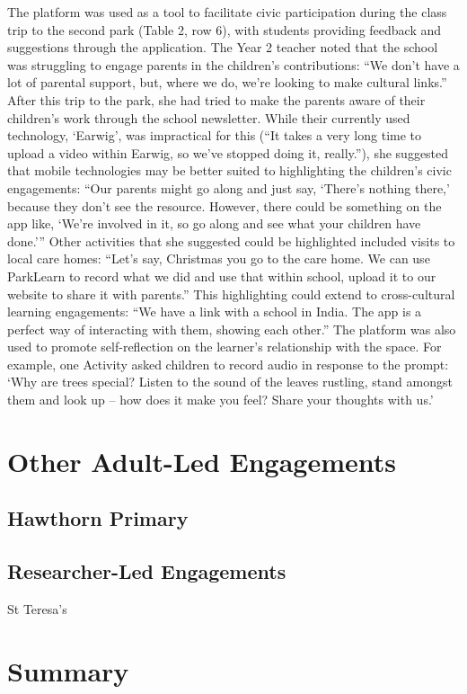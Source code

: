 The platform was used as a tool to facilitate civic participation during the class trip to the second park (Table 2, row 6), with students providing feedback and suggestions through the application. The Year 2 teacher noted that the school was struggling to engage parents in the children’s contributions: “We don’t have a lot of parental support, but, where we do, we’re looking to make cultural links.” After this trip to the park, she had tried to make the parents aware of their children’s work through the school newsletter. While their currently used technology, ‘Earwig’, was impractical for this (“It takes a very long time to upload a video within Earwig, so we’ve stopped doing it, really.”), she suggested that mobile technologies may be better suited to highlighting the children’s civic engagements: “Our parents might go along and just say, ‘There’s nothing there,’ because they don’t see the resource. However, there could be something on the app like, ‘We’re involved in it, so go along and see what your children have done.’” Other activities that she suggested could be highlighted included visits to local care homes: “Let’s say, Christmas you go to the care home. We can use ParkLearn to record what we did and use that within school, upload it to our website to share it with parents.” This highlighting could extend to cross-cultural learning engagements: “We have a link with a school in India. The app is a perfect way of interacting with them, showing each other.” The platform was also used to promote self-reflection on the learner’s relationship with the space. For example, one Activity asked children to record audio in response to the prompt: ‘Why are trees special? Listen to the sound of the leaves rustling, stand amongst them and look up – how does it make you feel? Share your thoughts with us.’ 

\section{Other Adult-Led Engagements}

\subsection{Hawthorn Primary}

\subsection{Researcher-Led Engagements}

St Teresa's

\section{Summary}